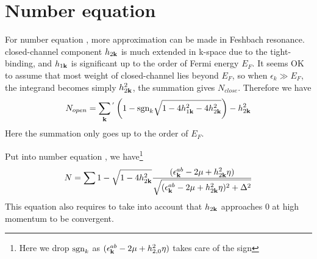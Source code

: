\section{Number equation}
For number equation , more approximation can be made in Feshbach resonance.  closed-channel component $h_{2\mathbf{k}}$ is much extended in k-space due to the tight-binding, and $h_{1\mathbf{k}}$ is significant up to the order of Fermi energy $E_{F}$.  It seems OK to assume that most weight of closed-channel lies beyond $E_{F}$, so when $\epsilon_{k}\gg{E_{F}}$, the integrand becomes simply $h_{2\mathbf{k}}^{2}$, the summation gives $N_{close}$.  Therefore we have 
\begin{equation}\label{eq:20101004:number}
N_{open}=\sum_{\mathbf{k}}{}^{'}\left(1-\text{sgn}_{k}\sqrt{1-4 h_{1\mathbf{k}}^2-4 h_{2\mathbf{k}}^2}\right)-h_{2\mathbf{k}}^{2}
\end{equation} 
Here the summation only goes up to the order of $E_{F}$.


Put  into number equation , we have\footnote{Here we drop $\text{sgn}_{k}$ as $(\epsilon^{ab}_{\mathbf{k}}-2\mu+  h_{2,0}^2\eta)$ takes care of the sign}
\begin{equation}\label{eq:20101011:number}
N=\sum{1-\sqrt{1-4h_{2\ensuremath{\mathbf{k}}}^{2}}\frac{(\epsilon^{ab}_{\ensuremath{\mathbf{k}}}-2\mu+  h_{2\ensuremath{\mathbf{k}}}^2\eta)}{{\sqrt{{(\epsilon^{ab}_{\ensuremath{\mathbf{k}}}-2\mu+  h_{2\ensuremath{\mathbf{k}}}^2\eta)^{2}+\Delta^{2}}}}}}
\end{equation}
This equation also requires to take into account that $h_{2\mathbf{k}}$ approaches 0 at high momentum to be convergent.

